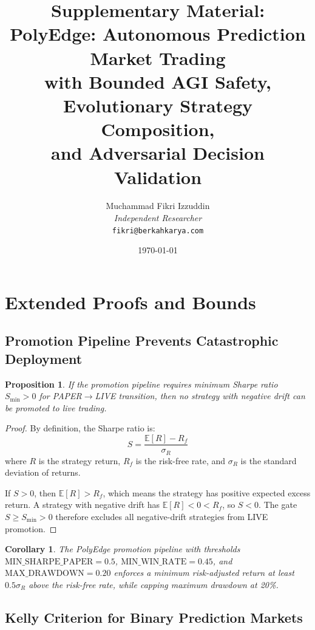 \documentclass[11pt]{article}
\title{Supplementary Material:\\PolyEdge: Autonomous Prediction Market Trading\\with Bounded AGI Safety, Evolutionary Strategy Composition,\\and Adversarial Decision Validation}
\author{Muchammad Fikri Izzuddin\\
\textit{Independent Researcher}\\
\texttt{fikri@berkahkarya.com}}
\date{\today}
\newtheorem{proposition}{Proposition}
\newtheorem{corollary}{Corollary}
\begin{document}
\maketitle

\tableofcontents
\newpage

\section{Extended Proofs and Bounds}
\label{sec:proofs}

\subsection{Promotion Pipeline Prevents Catastrophic Deployment}

\begin{proposition}
If the promotion pipeline requires minimum Sharpe ratio $S_{\min} > 0$ for PAPER$\to$LIVE transition, then no strategy with negative drift can be promoted to live trading.
\end{proposition}

\begin{proof}
By definition, the Sharpe ratio is:
\begin{equation}
S = \frac{\mathbb{E}[R] - R_f}{\sigma_R}
\end{equation}
where $R$ is the strategy return, $R_f$ is the risk-free rate, and $\sigma_R$ is the standard deviation of returns.

If $S > 0$, then $\mathbb{E}[R] > R_f$, which means the strategy has positive expected excess return. A strategy with negative drift has $\mathbb{E}[R] < 0 < R_f$, so $S < 0$. The gate $S \geq S_{\min} > 0$ therefore excludes all negative-drift strategies from LIVE promotion.
\end{proof}

\begin{corollary}
The PolyEdge promotion pipeline with thresholds $\text{MIN\_SHARPE\_PAPER} = 0.5$, $\text{MIN\_WIN\_RATE} = 0.45$, and $\text{MAX\_DRAWDOWN} = 0.20$ enforces a minimum risk-adjusted return at least $0.5\sigma_R$ above the risk-free rate, while capping maximum drawdown at 20\%.
\end{corollary}

\subsection{Kelly Criterion for Binary Prediction Markets}
\end{document}

